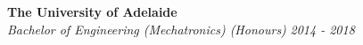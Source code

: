 {\textbf{The University of Adelaide}} \\
\headerrow
    {\emph{Bachelor of Engineering (Mechatronics) (Honours)}}
    {\emph{2014 - 2018}}
